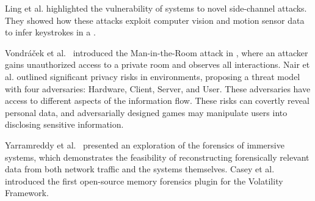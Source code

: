 Ling et al. \cite{ling2019know} highlighted the vulnerability of \VR systems to novel side-channel attacks. 
They showed how these attacks exploit computer vision and motion sensor data to infer keystrokes in a \VE. 

Vondráček et al.~\cite{vondravcek2023rise} introduced the Man-in-the-Room attack in \VR, where an attacker gains unauthorized access to a private \VR room and observes all interactions. 
Nair et al. \cite{nair2023exploring} outlined significant privacy risks in \VR environments, proposing a threat model with four adversaries: Hardware, Client, Server, and User. These adversaries have access to different aspects of the \VR information flow. These risks can covertly reveal personal data, and adversarially designed \VR games may manipulate users into disclosing sensitive information.

Yarramreddy et al.~\cite{Yarramreddy} presented an exploration of the forensics of immersive \VR systems, which demonstrates the feasibility of reconstructing forensically relevant data from both network traffic and the systems themselves. 
Casey et al.~\cite{Casey} introduced the first open-source \VR memory forensics plugin for the Volatility Framework. 

